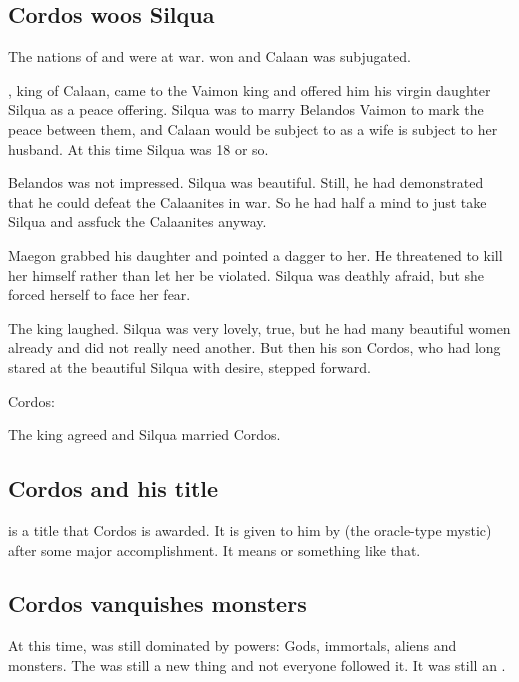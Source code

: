 \subsection{Cordos woos Silqua}
The nations of  and  were at war. 
\Imrath won and Calaan was subjugated. 

, king of Calaan, came to the Vaimon king and offered him his virgin daughter Silqua as a peace offering. 
Silqua was to marry Belandos Vaimon to mark the peace between them, and Calaan would be subject to \Imrath as a wife is subject to her husband. 
At this time Silqua was 18 or so.

Belandos was not impressed. 
Silqua was beautiful.
Still, he had demonstrated that he could defeat the Calaanites in war.
So he had half a mind to just take Silqua and assfuck the Calaanites anyway. 

Maegon grabbed his daughter and pointed a dagger to her. 
He threatened to kill her himself rather than let her be violated. 
Silqua was deathly afraid, but she forced herself to face her fear. 

The king laughed.
Silqua was very lovely, true, but he had many beautiful women already and did not really need another. 
But then his son Cordos, who had long stared at the beautiful Silqua with desire, stepped forward. 

Cordos:

The king agreed and Silqua married Cordos.









\subsection{Cordos and his title}
 is a title that Cordos is awarded. 
It is given to him by \Delphine{} (the oracle-type mystic) after some major accomplishment. 
It means  or something like that. 









\subsection{Cordos vanquishes monsters}
At this time, \Miith{} was still dominated by  powers: 
Gods, immortals, aliens and monsters. 
The  was still a new thing and not everyone followed it. 
It was still an . 

